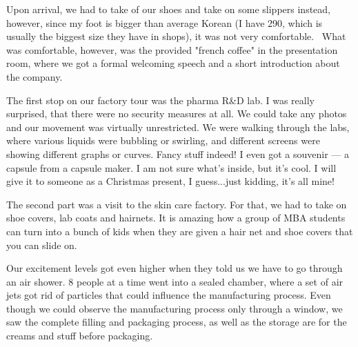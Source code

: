 \begin{post}
\begin{content}
Upon arrival, we had to take of our shoes and take on some slippers instead, however, since my foot is bigger than average Korean (I have 290, which is usually the biggest size they have in shops), it was not very comfortable.  What was comfortable, however, was the provided "french coffee" in the presentation room, where we got a formal welcoming speech and a short introduction about the company.


The first stop on our factory tour was the pharma R\&D lab. I was really surprised, that there were no security measures at all. We could take any photos and our movement was virtually unrestricted. We were walking through the labs, where various liquids were bubbling or swirling, and different screens were showing different graphs or curves. Fancy stuff indeed! I even got a souvenir — a capsule from a capsule maker. I am not sure what's inside, but it's cool. I will give it to someone as a Christmas present, I guess...just kidding, it's all mine!


The second part was a visit to the skin care factory. For that, we had to take on shoe covers, lab coats and hairnets. It is amazing how a group of MBA students can turn into a bunch of kids when they are given a hair net and shoe covers that you can slide on.


Our excitement levels got even higher when they told us we have to go through an air shower. 8 people at a time went into a sealed chamber, where a set of air jets got rid of particles that could influence the manufacturing process. Even though we could observe the manufacturing process only through a window, we saw the complete filling and packaging process, as well as the storage are for the creams and stuff before packaging.


\end{content}
\end{post}
